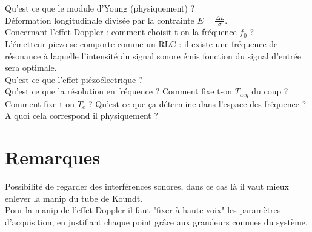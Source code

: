 \documentclass[12pt,prb,aps,epsf]{article}
\begin{document}
Qu'est ce que le module d'Young (physiquement) ?\\
Déformation longitudinale divisée par la contrainte $E = \frac{\Delta L}{\sigma}$.\\

Concernant l'effet Doppler : comment choisit t-on la fréquence $f_0$ ?\\
L'émetteur piezo se comporte comme un RLC : il existe une fréquence de résonance à laquelle l'intensité du signal sonore émis fonction du signal d'entrée sera optimale.\\

Qu'est ce que l'effet piézoélectrique ?\\
	
Qu'est ce que la résolution en fréquence ? Comment fixe t-on $T_{acq}$ du coup ?\\

Comment fixe t-on $T_e$ ? Qu'est ce que ça détermine dans l'espace des fréquence ? A quoi cela correspond il physiquement ?

\section*{Remarques}
Possibilité de regarder des interférences sonores, dans ce cas là il vaut mieux enlever la manip du tube de Koundt.\\
Pour la manip de l'effet Doppler il faut "fixer à haute voix" les paramètres d'acquisition, en justifiant chaque point grâce aux grandeurs connues du système.\\
\end{document}
